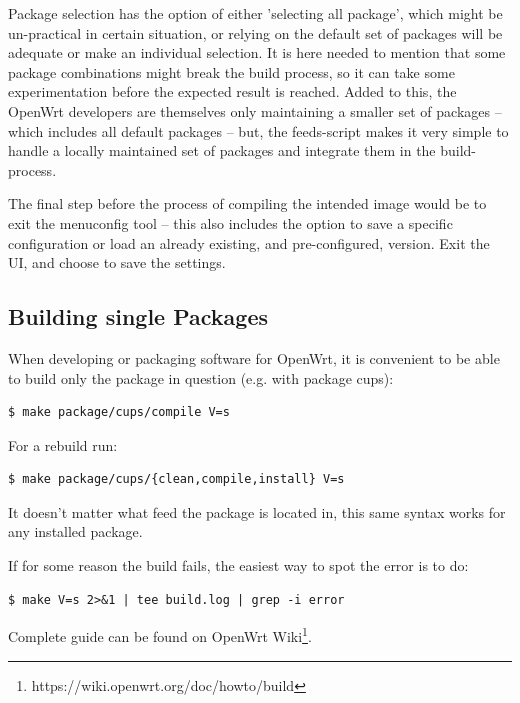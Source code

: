 Package selection has the option of either 'selecting all package', which might be un-practical in certain situation, or relying on the default set of packages will be adequate or make an individual selection.
It is here needed to mention that some package combinations might break the build process, so it can take some experimentation before the expected result is reached.
Added to this, the OpenWrt developers are themselves only maintaining a smaller set of packages – which includes all default packages – but, the feeds-script makes it very simple to handle a locally maintained set of packages and integrate them in the build-process.

The final step before the process of compiling the intended image would be to exit the menuconfig tool – this also includes the option to save a specific configuration or load an already existing, and pre-configured, version.
Exit the UI, and choose to save the settings\cite{build_owrt}.



\subsection{Building single Packages}

When developing or packaging software for OpenWrt, it is convenient to be able to build only the package in question (e.g. with package cups):
\begin{lstlisting}[columns=fixed,basicstyle=\ttfamily\footnotesize,tabsize=4,backgroundcolor=\color{yellow!10}]
$ make package/cups/compile V=s
\end{lstlisting}
For a rebuild run:
\begin{lstlisting}[columns=fixed,basicstyle=\ttfamily\footnotesize,tabsize=4,backgroundcolor=\color{yellow!10}]
$ make package/cups/{clean,compile,install} V=s
\end{lstlisting}
It doesn't matter what feed the package is located in, this same syntax works for any installed package.

If for some reason the build fails, the easiest way to spot the error is to do:
\begin{lstlisting}[columns=fixed,basicstyle=\ttfamily\footnotesize,tabsize=4,backgroundcolor=\color{yellow!10}]
$ make V=s 2>&1 | tee build.log | grep -i error
\end{lstlisting}
Complete guide can be found on OpenWrt Wiki\footnote{https://wiki.openwrt.org/doc/howto/build}.
